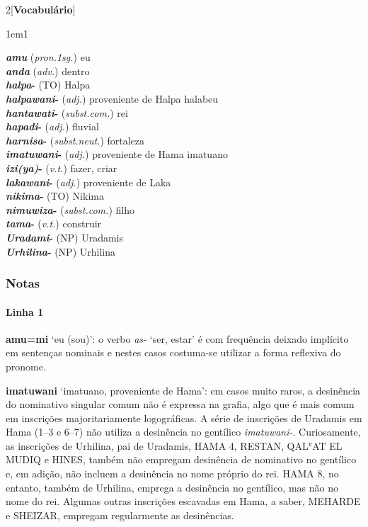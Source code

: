 \bigskip
\begin{multicols}{2}[\noindent\textbf{Vocabulário}]
	\begin{hangparas}{1em}{1}
		\raggedright%
		\textbf{\emph{amu}} (\emph{pron.1sg.}) \tabto{1em} eu\\
		\textbf{\emph{anda}} (\emph{adv.}) \tabto{1em} dentro\\
		\textbf{\emph{halpa}-} (TO) \tabto{1em} Halpa\\
		\textbf{\emph{halpawani}-} (\emph{adj.}) \tabto{1em} proveniente de Halpa \tabto{1em} halabeu\\
		\textbf{\emph{hantawati}-} (\emph{subst.com.}) \tabto{1em} rei\\
		\textbf{\emph{hapadi}-} (\emph{adj.}) \tabto{1em} fluvial\\
		\textbf{\emph{harnisa}-} (\emph{subst.neut.}) \tabto{1em} fortaleza\\
		\textbf{\emph{imatuwani}-} (\emph{adj.}) \tabto{1em} proveniente de Hama
		\tabto{1em} imatuano\\
		\textbf{\emph{izi{(ya)}}-} (\emph{v.t.}) \tabto{1em} fazer, criar\\
		\textbf{\emph{lakawani}-} (\emph{adj.}) \tabto{1em} proveniente de Laka\\
		\textbf{\emph{nikima}-} (TO) \tabto{1em} Nikima\\
		\textbf{\emph{nimuwiza}-} (\emph{subst.com.}) \tabto{1em} filho\\
		\textbf{\emph{tama}-} (\emph{v.t.}) \tabto{1em} construir\\
		\textbf{\emph{Uradami}-} (NP) \tabto{1em} Uradamis\\
		\textbf{\emph{Urhilina}-} (NP) \tabto{1em} Urhilina\\
	\end{hangparas}
\end{multicols}

\subsubsection*{Notas}

\paragraph{Linha 1}
\textbf{amu=mi} `eu (sou)': o verbo \emph{as-} `ser, estar' é com frequência deixado
implícito em sentenças nominais e nestes casos costuma-se utilizar a
forma reflexiva do pronome.

\noindent\textbf{imatuwani} `imatuano, proveniente de Hama': em casos muito raros, a
desinência do nominativo singular comum não é expressa na grafia, algo que é
mais comum em inscrições majoritariamente logográficas. A série de inscrições de
Uradamis em Hama (1--3 e 6--7) não utiliza a desinência no gentílico
\emph{imatuwani-}.
Curiosamente, as inscrições de Urhilina, pai de Uradamis, HAMA 4,
RESTAN, QAL\textsc{ʿ}AT EL MUDIQ e HINES,
também não empregam desinência de nominativo no gentílico e, em adição, não
incluem a desinência no nome próprio do rei.
HAMA 8, no entanto, também de Urhilina, emprega a desinência no gentílico, mas
não no nome do rei.
Algumas outras inscrições escavadas em Hama, a saber, MEHARDE e SHEIZAR, empregam
regularmente as desinências.


